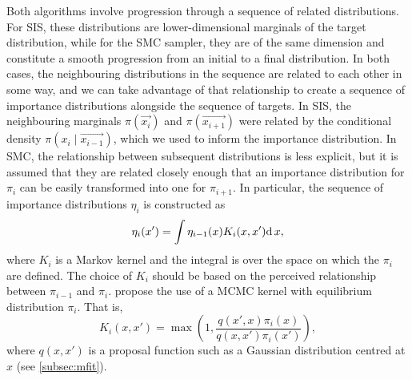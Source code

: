 Both algorithms involve progression through a sequence of related
distributions. For \gls{SIS}, these distributions are lower-dimensional
marginals of the target distribution, while for the \gls{SMC} sampler, they are
of the same dimension and constitute a smooth progression from an initial to a
final distribution. In both cases, the neighbouring distributions in the
sequence are related to each other in some way, and we can take advantage of
that relationship to create a sequence of importance distributions alongside
the sequence of targets. In \gls{SIS}, the neighbouring marginals
$\pi(\vec{x_i})$ and $\pi(\vec{x_{i+1}})$ were related by the conditional
density $\pi(x_i \mid \vec{x_{i-1}})$, which we used to inform the importance
distribution. In \gls{SMC}, the relationship between subsequent distributions
is less explicit, but it is assumed that they are related closely enough that
an importance distribution for $\pi_i$ can be easily transformed into one for
$\pi_{i+1}$. In particular, the sequence of importance distributions $\eta_i$
is constructed as
\begin{align}
  \label{eq:impint}
  \eta_i(x') = \int \eta_{i-1}(x) K_i(x, x') \mathrm{d}\, x,
\end{align}
where $K_i$ is a Markov kernel and the integral is over the space on which the
$\pi_i$ are defined. The choice of $K_i$ should be based on the perceived
relationship between $\pi_{i-1}$ and $\pi_i$. \textcite{del2006sequential}
propose the use of a \gls{MCMC} kernel with equilibrium distribution $\pi_i$.
That is,
\[
  K_i(x, x') = \max\left(1, \frac{q(x', x)\pi_i(x)}{q(x, x')\pi_i(x')}\right),
\]
where $q(x, x')$ is a proposal function such as a Gaussian distribution
centred at $x$ (see \cref{subsec:mfit}). 

